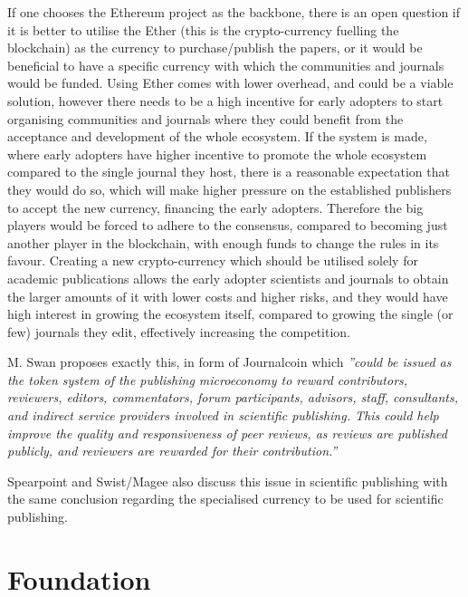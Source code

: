 \documentclass[12pt, a4paper]{article}
\begin{document}
If one chooses the Ethereum project as the backbone, there is an open question if it is better to utilise the Ether (this is the crypto-currency fuelling the blockchain) as the currency to purchase/publish the papers, or it would be beneficial to have a specific currency with which the communities and journals would be funded. Using Ether comes with lower overhead, and could be a viable solution, however there needs to be a high incentive for early adopters to start organising communities and journals where they could benefit from the acceptance and development of the whole ecosystem. If the system is made, where early adopters have higher incentive to promote the whole ecosystem compared to the single journal they host, there is a reasonable expectation that they would do so, which will make higher pressure on the established publishers to accept the new currency, financing the early adopters. Therefore the big players would be forced to adhere to the consensus, compared to becoming just another player in the blockchain, with enough funds to change the rules in its favour. Creating a new crypto-currency which should be utilised solely for academic publications allows the early adopter scientists and journals to obtain the larger amounts of it with lower costs and higher risks, and they would have high interest in growing the ecosystem itself, compared to growing the single (or few) journals they edit, effectively increasing the competition.

M. Swan \cite{swan2015blockchain} proposes exactly this, in form of Journalcoin which \textit{''could be issued as the token system of the publishing microeconomy to
reward contributors, reviewers, editors, commentators, forum participants, advisors,
staff, consultants, and indirect service providers involved in scientific publishing.
This could help improve the quality and responsiveness of peer reviews, as reviews
are published publicly, and reviewers are rewarded for their contribution.''} 

Spearpoint \cite{spearpoint2017proposed} and Swist/Magee \cite{swist2018academic} also discuss this issue in scientific publishing with the same conclusion regarding the specialised currency to be used for scientific publishing.

\section{Foundation}
\end{document}
